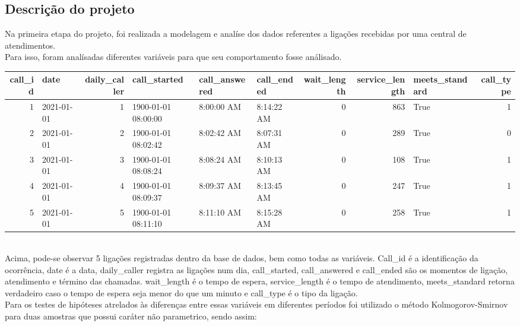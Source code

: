 \subsection{Descrição do projeto}
Na primeira etapa do projeto, foi realizada a modelagem e analíse dos dados referentes a ligações recebidas por uma central de atendimentos.\\
Para isso, foram analísadas diferentes variáveis para que seu comportamento fosse análisado.\\
\begin{tabular}{rlrlllrrlr}
    \toprule
     call\_id &    date    &  daily\_caller &     call\_started    & call\_answered & call\_ended &  wait\_length &  service\_length &  meets\_standard &  call\_type \\
    \midrule
       1     & 2021-01-01 &       1       & 1900-01-01 08:00:00 &   8:00:00 AM  & 8:14:22 AM &      0       &       863       &       True      &     1      \\
       2     & 2021-01-01 &       2       & 1900-01-01 08:02:42 &   8:02:42 AM  & 8:07:31 AM &      0       &       289       &       True      &     0      \\
       3     & 2021-01-01 &       3       & 1900-01-01 08:08:24 &   8:08:24 AM  & 8:10:13 AM &      0       &       108       &       True      &     1      \\
       4     & 2021-01-01 &       4       & 1900-01-01 08:09:37 &   8:09:37 AM  & 8:13:45 AM &      0       &       247       &       True      &     1      \\
       5     & 2021-01-01 &       5       & 1900-01-01 08:11:10 &   8:11:10 AM  & 8:15:28 AM &      0       &       258       &       True      &     1      \\
    \bottomrule
    \end{tabular}
\\
Acima, pode-se observar 5 ligações registradas dentro da base de dados, bem como todas as variáveis. Call\_id é a identificação da ocorrência, date é a data, daily\_caller registra as ligações num dia, call\_started, call\_answered e call\_ended são os momentos de ligação, atendimento e término das chamadas. 
wait\_length é o tempo de espera,  service\_length é o tempo de atendimento, meets\_standard retorna verdadeiro caso o tempo de espera seja menor do que um minuto e call\_type é o tipo da ligação.\\
Para os testes de hipóteses atrelados às diferenças entre essas variáveis em diferentes períodos foi utilizado o método Kolmogorov-Smirnov para duas amostras que possui caráter não parametrico, sendo assim:\\
